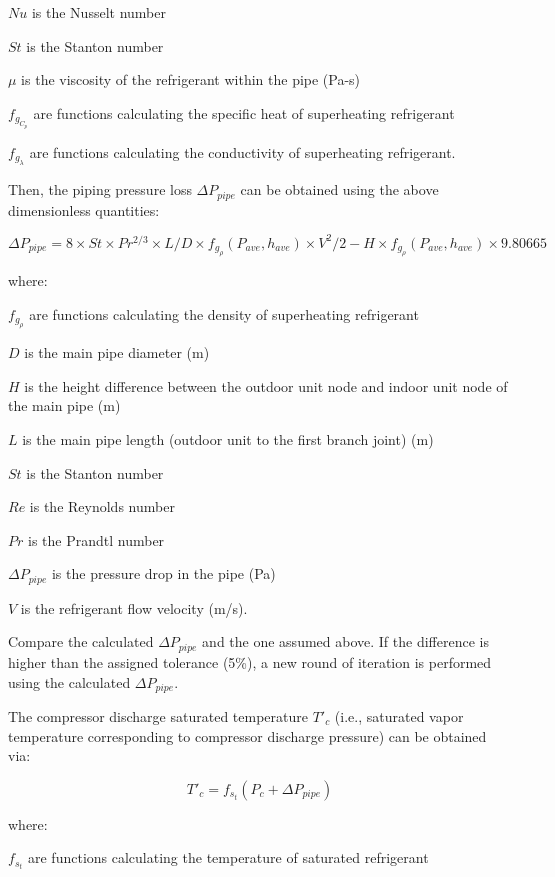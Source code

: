 \(Nu\) is the Nusselt number

\(St\) is the Stanton number

\(\mu\) is the viscosity of the refrigerant within the pipe (Pa-s)

\(f_{g_{C_p}}\) are functions calculating the specific heat of superheating refrigerant

\(f_{g_\lambda}\) are functions calculating the conductivity of superheating refrigerant.

Then, the piping pressure loss \(\Delta{P_{pipe}}\) can be obtained using the above dimensionless quantities:

\begin{equation}
\Delta{P_{pipe}} = 8\times{St}\times{Pr^{2/3}}\times{L/D}\times{f_{g_\rho}(P_{ave},h_{ave})}\times{V^2}/2-H\times{f_{g_\rho}(P_{ave},h_{ave})}\times9.80665
\end{equation}

where:

\(f_{g_\rho}\) are functions calculating the density of superheating refrigerant

\(D\) is the main pipe diameter (m)

\(H\) is the height difference between the outdoor unit node and indoor unit node of the main pipe (m)

\(L\) is the main pipe length (outdoor unit to the first branch joint) (m)

\(St\) is the Stanton number

\(Re\) is the Reynolds number

\(Pr\) is the Prandtl number

\(\Delta{P_{pipe}}\) is the pressure drop in the pipe (Pa)

\(V\) is the refrigerant flow velocity (m/s).

Compare the calculated \(\Delta{P_{pipe}}\) and the one assumed above. If the difference is higher than the assigned tolerance (5\%), a new round of iteration is performed using the calculated \(\Delta{P_{pipe}}\).

The compressor discharge saturated temperature \(T'_c\) (i.e., saturated vapor temperature corresponding to compressor discharge pressure) can be obtained via:

\begin{equation}
T'_c = f_{s_t}(P_c+\Delta{P_{pipe}})
\end{equation}

where:

\(f_{s_t}\) are functions calculating the temperature of saturated refrigerant

